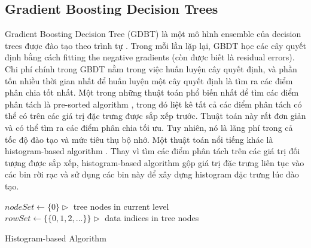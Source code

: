 \subsection{Gradient Boosting Decision Trees}
\label{ssec:gbdt}

Gradient Boosting Decision Tree (GDBT) là một mô hình ensemble của decision trees được đào tạo theo trình tự \cite{friedman2001greedy}. 
Trong mỗi lần lặp lại, GBDT học các cây quyết định bằng cách fitting the negative gradients (còn được biết là residual errors).
Chi phí chính trong GBDT nằm trong việc huấn luyện cây quyết định, và phần tốn nhiều thời gian nhất để huấn luyện một cây quyết định là tìm ra các điểm phân chia tốt nhất.
Một trong những thuật toán phổ biến nhất để tìm các điểm phân tách là pre-sorted algorithm \cite{mehta1996sliq, shafer1996sprint}, trong đó liệt kê tất cả các điểm phân tách có thể có trên các giá trị đặc trưng được sắp xếp trước.
Thuật toán này rất đơn giản và có thể tìm ra các điểm phân chia tối ưu.
Tuy nhiên, nó là lãng phí trong cả tốc độ đào tạo và mức tiêu thụ bộ nhớ.
Một thuật toán nổi tiếng khác là histogram-based
algorithm \cite{ranka1998clouds, jin2003communication, li2008mcrank}. 
Thay vì tìm các điểm phân tách trên các giá trị đối tượng được sắp xếp, histogram-based algorithm gộp giá trị đặc trưng liên tục vào các bin rời rạc và sử dụng các bin này để xây dựng histogram đặc trưng lúc đào tạo.

\bigskip
\begin{algorithm}[H]
 $nodeSet \leftarrow \{0\} \triangleright$ tree nodes in current level \\
 $rowSet \leftarrow \{\{0, 1, 2, ...\}\} \triangleright$ data indices in tree nodes \\
 \caption{Histogram-based Algorithm}
 \label{alg:histogram-based}
\end{algorithm}
\bigskip

